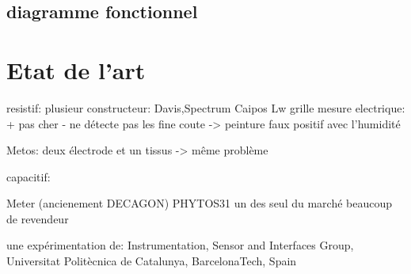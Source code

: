 \documentclass[a4paper,11pt,twoside,openright]{article} %
\begin{document}
\subsection{diagramme fonctionnel}

\section{Etat de l'art}
resistif:
plusieur constructeur:
Davis,Spectrum Caipos Lw
grille mesure electrique:
+ pas cher
- ne détecte pas les fine coute -> peinture
faux positif avec l'humidité

Metos: deux électrode et un tissus -> même problème

capacitif:

Meter (ancienement DECAGON) PHYTOS31 
un des seul du marché beaucoup de revendeur

une expérimentation de: Instrumentation, Sensor and Interfaces Group, Universitat Politècnica de Catalunya, BarcelonaTech, Spain
\end{document}

